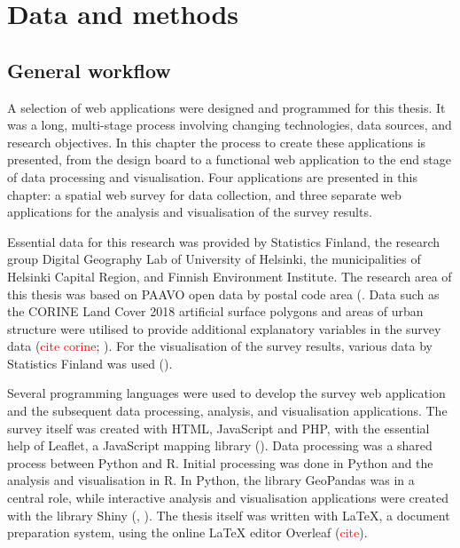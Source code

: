 \section{Data and methods}
\subsection{General workflow}
\justify

A selection of web applications were designed and programmed for this thesis. It was a long, multi-stage process involving changing technologies, data sources, and research objectives. In this chapter the process to create these applications is presented, from the design board to a functional web application to the end stage of data processing and visualisation. Four applications are presented in this chapter: a spatial web survey for data collection, and three separate web applications for the analysis and visualisation of the survey results.

Essential data for this research was provided by Statistics Finland, the research group Digital Geography Lab of University of Helsinki, the municipalities of Helsinki Capital Region, and Finnish Environment Institute. The research area of this thesis was based on PAAVO open data by postal code area (\cite{StatisticsFinland2019a}. Data such as the CORINE Land Cover 2018 artificial surface polygons and areas of urban structure were utilised to provide additional explanatory variables in the survey data (\textcolor{red}{cite corine}; \cite{Ristimaki2017}). For the visualisation of the survey results, various data by Statistics Finland was used (\cite{StatisticsFinland2012}).

Several programming languages were used to develop the survey web application and the subsequent data processing, analysis, and visualisation applications. The survey itself was created with HTML, JavaScript and PHP, with the essential help of Leaflet, a JavaScript mapping library (\cite{Agafonkin2019}). Data processing was a shared process between Python and R. Initial processing was done in Python and the analysis and visualisation in R. In Python, the library GeoPandas was in a central role, while interactive analysis and visualisation applications were created with the library Shiny (\cite{GeoPandasDevelopers2019}, \cite{Chang2019}). The thesis itself was written with LaTeX, a document preparation system, using the online LaTeX editor Overleaf (\textcolor{red}{cite}).

